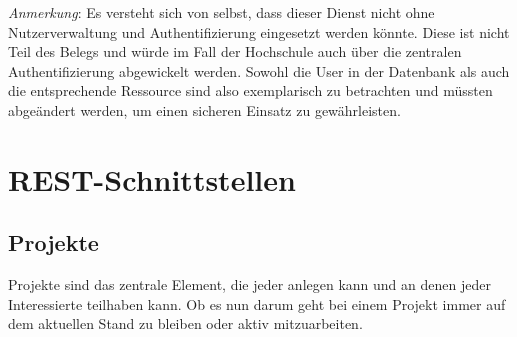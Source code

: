 \documentclass[12pt]{scrartcl}
\begin{document}
		\emph{Anmerkung}: Es versteht sich von selbst, dass dieser Dienst nicht ohne Nutzerverwaltung und Authentifizierung eingesetzt werden könnte. Diese ist nicht Teil des Belegs und würde im Fall der Hochschule auch über die zentralen Authentifizierung abgewickelt werden. Sowohl die User in der Datenbank als auch die entsprechende Ressource sind also exemplarisch zu betrachten und müssten abgeändert werden, um einen sicheren Einsatz zu gewährleisten.

	\section{REST-Schnittstellen} \label{sec:restschnittstellen}
\subsection{Projekte}
	Projekte sind das zentrale Element, die jeder anlegen kann und an denen jeder Interessierte teilhaben kann. Ob es nun darum geht bei einem Projekt immer auf dem aktuellen Stand zu bleiben oder aktiv mitzuarbeiten.
\end{document}

